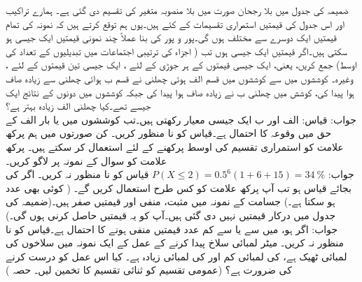 ضمیمہ  کی جدول  میں بلا رجحان صورت میں بلا منصوبہ متغیر  کی تقسیم دی گئی ہے۔  ہمارے تراکیب اور اس  جدول کی قیمتیں استمراری تقسیمات کے کئے ہیں۔یوں ہم توقع کرتے ہیں کہ نمونہ کی تمام قیمتیں ایک دوسرے سے مختلف ہوں گی۔پور و پور کی بنا عملاً چند نمونی قیمتیں ایک جیسی ہو سکتی ہیں۔اگر  قیمتیں ایک جیسی ہوں تب  ( اجزاء کی ترتیبی اجتماعات میں تبدیلیوں کے تعداد کی اوسط) جمع کریں، یعنی، ایک جیسی قیمتوں کے ہر جوڑی کے لئے ، ایک جیسی تین قیمتوں کے لئے ، وغیرہ۔
\quad
{} کوششوں میں سے  کوششوں میں قسم الف ہوئی چھلنی نے قسم ب ہوائی چھلنی سے زیادہ صاف ہوا پیدا کی،  کوشش میں چھلنی ب نے زیادہ صاف ہوا پیدا کی جبکہ  کوششوں میں دونوں کے نتائج ایک جیسے تھے۔کیا چھلنی الف زیادہ بہتر ہے؟\\
جواب:\quad
قیاس: الف اور ب ایک جیسی معیار رکھتی ہیں۔تب  کوششوں میں  یا  بار الف کے حق میں وقوعہ کا احتمال  ہے۔قیاس کو نا منظور کریں۔ 
\quad
کن صورتوں میں ہم پرکھ علامت کو استمراری تقسیم کی اوسط پرکھنے کے لئے استعمال کر سکتے ہیں۔
\quad
پرکھ علامت کو سوال   کے نمونہ پر لاگو کریں۔\\
جواب:\quad
$P(X\le 2)=0.5^6(1+6+15)=\SI{34}{\percent}$
قیاس  کو نا منظور نہ کریں۔
\quad
اگر  کی بجائے قیاس  ہو تب آپ پرکھ علامت  کو کس طرح استعمال کریں گے۔ ( کوئی بھی عدد ہو سکتا ہے۔)
\quad
{} جسامت کے نمونہ میں  مثبت،  منفی اور  قیمتیں صفر ہیں۔(ضمیمہ  کی جدول  میں درکار قیمتیں نہیں دی گئی ہیں۔آپ کو یہ قیمتیں حاصل کرنی ہوں گی۔)\\
جواب:\quad
اگر  ہو،  میں سے  یا  سے کم عدد قیمتیں منفی ہونے کا احتمال  ہے۔قیاس  کو نا منظور نہ کریں۔
\quad
{} میٹر لمبائی سلاخ پیدا کرنے  کے عمل کے ایک نمونہ میں  سلاخوں کی لمبائی ٹھیک ہے،  کی لمبائی کم اور  کی لمبائی زیادہ ہے۔ کیا اس عمل کو درست کرنے کی ضرورت ہے؟ (عمومی تقسیم کو ثنائی تقسیم کا تخمین لیں۔ حصہ )
